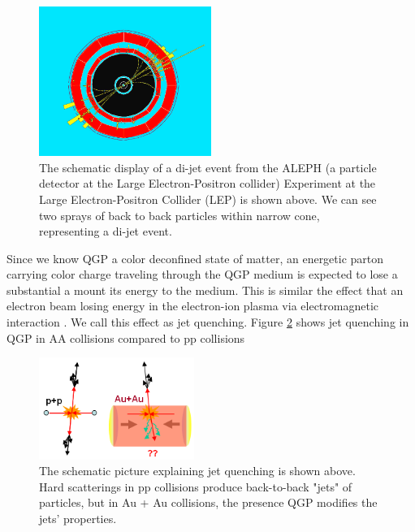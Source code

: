 \begin{figure}[hbtp]
\begin{center}
\includegraphics[width=0.50\textwidth]{Figures/Chapter1/DijetEvt.png}
\caption{The schematic display of a di-jet event from the ALEPH (a particle detector at the Large Electron-Positron collider) Experiment at the Large Electron-Positron Collider (LEP) is shown above. We can see two sprays of back to back particles within narrow cone, representing a di-jet event.}
\label{dijet}
\end{center}
\end{figure} 


Since we know QGP a color deconfined state of matter, an energetic parton carrying color charge traveling through the QGP medium is expected to lose a substantial a mount its energy to the medium. This is similar the effect that an electron beam losing energy in the electron-ion plasma via electromagnetic interaction \cite{ELossPlasma}. We call this effect as jet quenching. Figure \ref{JetELoss} shows jet quenching in QGP in AA collisions compared to pp collisions

\begin{figure}[hbtp]
\begin{center}
\includegraphics[width=0.45\textwidth]{Figures/Chapter1/JetELoss.png}
\caption{The schematic picture explaining jet quenching is shown above. Hard scatterings in pp collisions produce back-to-back "jets" of particles, but in Au + Au collisions, the presence QGP modifies the jets' properties.}
\label{JetELoss}
\end{center}
\end{figure} 


